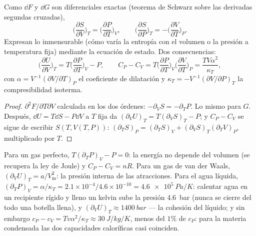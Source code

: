 \begin{theorem}\label{thm:b2:thermodynamic-potentials:maxwell}
Como $\dd F$ y $\dd G$ son diferenciales exactas (teorema de Schwarz
sobre las derivadas segundas cruzadas),
\[
\Big(\frac{\partial S}{\partial V}\Big)_T = \Big(\frac{\partial P}{\partial T}\Big)_V,
\qquad
\Big(\frac{\partial S}{\partial P}\Big)_T = -\Big(\frac{\partial V}{\partial T}\Big)_P .
\]
Expresan lo inmensurable (cómo varía la entropía con el volumen o
la presión a temperatura fija) mediante la ecuación de estado. Dos
consecuencias:
\[
\Big(\frac{\partial U}{\partial V}\Big)_T = T\Big(\frac{\partial P}{\partial T}\Big)_V - P,
\qquad
C_P - C_V = T\Big(\frac{\partial P}{\partial T}\Big)_V\Big(\frac{\partial V}{\partial T}\Big)_P
= \frac{TV\alpha^2}{\kappa_T} ,
\]
con $\alpha = V^{-1}(\partial V/\partial T)_P$ el coeficiente de dilatación y
$\kappa_T = -V^{-1}(\partial V/\partial P)_T$ la compresibilidad isoterma.
\end{theorem}

\begin{proof}
$\partial^2F/\partial T\partial V$ calculada en los dos órdenes: $-\partial_VS =
-\partial_TP$. Lo mismo para $G$. Después, $\dd U = T\dd S - P\dd V$ a $T$ fija
da $(\partial_VU)_T = T(\partial_VS)_T - P$; y $C_P - C_V$ se sigue
de escribir $S(T,V(T,P))$: $(\partial_TS)_P = (\partial_TS)_V +
(\partial_VS)_T(\partial_TV)_P$, multiplicado por $T$.
\end{proof}

\begin{example}\label{ex:b2:thermodynamic-potentials:reveal}
Para un gas perfecto, $T(\partial_TP)_V - P = 0$: la energía no depende
del volumen (se recupera la ley de Joule) y $C_P - C_V = nR$. Para un gas de van
der Waals, $(\partial_VU)_T = a/V_{\text{m}}^2$: la presión interna de
las atracciones. Para el agua líquida, $(\partial_TP)_V = \alpha/\kappa_T = 2.1
\times 10^{-4}/4.6 \times 10^{-10} = \qty{4.6e5}{Pa/K}$: calentar agua en un
recipiente rígido y lleno un kelvin sube la presión \qty{4.6}{bar}
(nunca se cierre del todo una botella llena), y $(\partial_VU)_T \approx \qty{1400}{bar}$ ---
la cohesión del líquido; y sin embargo $c_P - c_V = Tv\alpha^2/\kappa_T \approx
\qty{30}{J/kg/K}$, menos del $1\%$ de $c_P$: para la materia condensada las dos
capacidades caloríficas casi coinciden.
\end{example}

